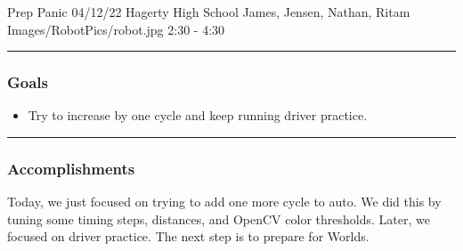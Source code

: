 \insertmeeting 
	{Prep Panic} 
	{04/12/22} 
	{Hagerty High School}
	{James, Jensen, Nathan, Ritam}
	{Images/RobotPics/robot.jpg}
	{2:30 - 4:30}
	
\noindent\hfil\rule{\textwidth}{.4pt}\hfil
\subsubsection*{Goals}
\begin{itemize}
    \item Try to increase by one cycle and keep running driver practice.

\end{itemize} 

\noindent\hfil\rule{\textwidth}{.4pt}\hfil

\subsubsection*{Accomplishments}
Today, we just focused on trying to add one more cycle to auto. We did this by tuning some timing steps, distances, and OpenCV color thresholds. Later, we focused on driver practice. The next step is to prepare for Worlds.




